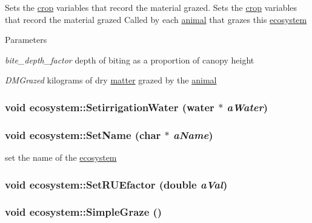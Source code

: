 Sets the \hyperlink{classcrop}{crop} variables that record the material grazed. Sets the \hyperlink{classcrop}{crop} variables that record the material grazed Called by each \hyperlink{classanimal}{animal} that grazes this \hyperlink{classecosystem}{ecosystem} 
\begin{DoxyParams}{Parameters}
\item[{\em bite\_\-depth\_\-factor}]depth of biting as a proportion of canopy height \item[{\em DMGrazed}]kilograms of dry \hyperlink{classmatter}{matter} grazed by the \hyperlink{classanimal}{animal} \end{DoxyParams}
\hypertarget{classecosystem_aee78909c3c7389e4393b13755e2bb6e1}{
\subsubsection[{SetirrigationWater}]{\setlength{\rightskip}{0pt plus 5cm}void ecosystem::SetirrigationWater ({\bf water} $\ast$ {\em aWater})}}
\label{classecosystem_aee78909c3c7389e4393b13755e2bb6e1}
\hypertarget{classecosystem_a59d0051172bd35dfd8d3189b0cd5d490}{
\subsubsection[{SetName}]{\setlength{\rightskip}{0pt plus 5cm}void ecosystem::SetName (char $\ast$ {\em aName})}}
\label{classecosystem_a59d0051172bd35dfd8d3189b0cd5d490}


set the name of the \hyperlink{classecosystem}{ecosystem} \hypertarget{classecosystem_a5b1f3bbeed25c72f36d6e0ef552a9182}{
\subsubsection[{SetRUEfactor}]{\setlength{\rightskip}{0pt plus 5cm}void ecosystem::SetRUEfactor (double {\em aVal})}}
\label{classecosystem_a5b1f3bbeed25c72f36d6e0ef552a9182}
\hypertarget{classecosystem_aeded9da6bd5084389b3740acf00b871c}{
\subsubsection[{SimpleGraze}]{\setlength{\rightskip}{0pt plus 5cm}void ecosystem::SimpleGraze ()}}
\label{classecosystem_aeded9da6bd5084389b3740acf00b871c}


